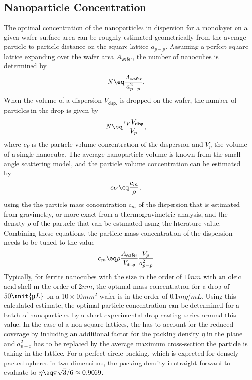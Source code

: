 \documentclass[\main/dresen_thesis.tex]{subfiles}
\begin{document}
      \subsection{Nanoparticle Concentration}
        The optimal concentration of the nanoparticles in dispersion for a monolayer on a given wafer surface area can be roughly estimated geometrically from the average particle to particle distance on the square lattice $a_{p-p}$.
        Assuming a perfect square lattice expanding over the wafer area $A_{\textsf{wafer}}$, the number of nanocubes is determined by
        \begin{align}
          N \eq \frac{A_{\textsf{wafer}}}{a_{p-p}^2}.
        \end{align}
        When the volume of a dispersion $V_{\textsf{disp.}}$ is dropped on the wafer, the number of particles in the drop is given by
        \begin{align}
          N \eq \frac{c_V V_{\textsf{disp}}}{V_p},
        \end{align}
        where $c_V$ is the particle volume concentration of the dispersion and $V_p$ the volume of a single nanocube.
        The average nanoparticle volume is known from the small-angle scattering model, and the particle volume concentration can be estimated by
        \begin{align}
          c_V \eq \frac{c_m}{\rho},
        \end{align}
        using the the particle mass concentration $c_m$ of the dispersion that is estimated from gravimetry, or more exact from a thermogravimetric analysis, and the density $\rho$ of the particle that can be estimated using the literature value.
        Combining these equations, the particle mass concentration of the dispersion needs to be tuned to the value
        \begin{align}\label{eq:monolayers:preparation:particleConcentration}
          c_m \eq \rho \frac{A_{\textsf{wafer}}}{V_{\textsf{disp}}} \frac{V_p}{a_{p-p}^2}
        \end{align}
        Typically, for ferrite nanocubes with the size in the order of $10 \unit{nm}$ with an oleic acid shell in the order of $2 \unit{nm}$, the optimal mass concentration for a drop of $50 \unit{\text{\textmu} L}$ on a $10\times 10 \unit{mm^2}$ wafer is in the order of $0.1 \unit{mg/mL}$.
        Using this calculated estimate, the optimal particle concentration can be determined for a batch of nanoparticles by a short experimental drop casting series around this value.
        In the case of a non-square lattices, the  has to account for the reduced coverage by including an additional factor for the packing density $\eta$ in the plane and $a_{p-p}^2$ has to be replaced by the average maximum cross-section the particle is taking in the lattice.
        For a perfect circle packing, which is expected for densely packed spheres in two dimensions, the packing density is straight forward to evaluate to $\eta \eq \pi \sqrt{3} / 6 \approx 0.9069$.
\end{document}
